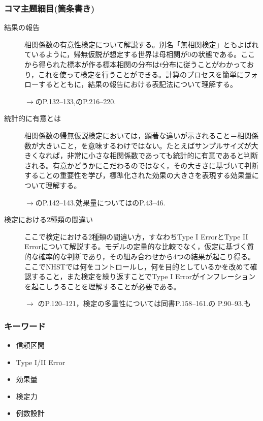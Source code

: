 \subsubsection{コマ主題細目(箇条書き)}
\begin{description}
	\item[結果の報告]相関係数の有意性検定について解説する。別名「無相関検定」ともよばれているように，帰無仮説が想定する世界は母相関が0の状態である。ここから得られた標本が作る標本相関の分布は$t$分布に従うことがわかっており，これを使って検定を行うことができる。計算のプロセスを簡単にフォローするとともに，結果の報告における表記法について理解する。
	      \begin{flushright}
		      $\to$\citet{Yamada2004}のP.132--133,\citet{Yamauchi201001}のP.216--220.
	      \end{flushright}

	\item[統計的に有意とは]相関係数の帰無仮説検定においては，顕著な違いが示されること＝相関係数が大きいこと，を意味するわけではない。たとえばサンプルサイズが大きくなれば，非常に小さな相関係数であっても統計的に有意であると判断される。有意かどうかにこだわるのではなく，その大きさに基づいて判断することの重要性を学び，標準化された効果の大きさを表現する効果量について理解する。
	      \begin{flushright}
		      $\to$\citet{Yamada2004}のP.142--143.効果量については\citet{Matia201201}のP.43--46.
	      \end{flushright}

	\item[検定における2種類の間違い]ここで検定における2種類の間違い方，すなわちType I ErrorとType II Errorについて解説する。モデルの定量的な比較でなく，仮定に基づく質的な確率的な判断であり，その組み合わせから4つの結果が起こり得る。ここでNHSTでは何をコントロールし，何を目的としているかを改めて確認すること，また検定を繰り返すことでType I Errorがインフレーションを起こしうることを理解することが必要である。
	      \begin{flushright}
		      $\to$ \citet{Yamada2004}のP.120--121，検定の多重性については同書P.158--161.\citet{Kawabata201408}の P.90--93.も
	      \end{flushright}

\end{description}
\subsubsection{キーワード}
\begin{itemize}
	\item 信頼区間
	\item Type I/II Error
	\item 効果量
	\item 検定力
	\item 例数設計
\end{itemize}
